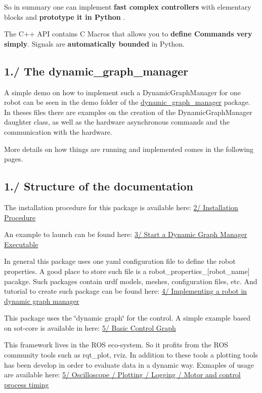 So in summary one can implement {\bfseries  fast complex controllers } with elementary blocks and {\bfseries  prototype it in Python }.

The C++ A\+PI contains C Macros that allows you to {\bfseries define Commands very simply}. Signals are {\bfseries automatically bounded} in Python.\hypertarget{index_intro_sec_dgm}{}\subsection{1./ The dynamic\+\_\+graph\+\_\+manager}\label{index_intro_sec_dgm}
 A simple demo on how to implement such a Dynamic\+Graph\+Manager for one robot can be seen in the demo folder of the \hyperlink{namespacedynamic__graph__manager}{dynamic\+\_\+graph\+\_\+manager} package. In theses files there are examples on the creation of the Dynamic\+Graph\+Manager daughter class, as well as the hardware asynchronous commands and the communication with the hardware.

More details on how things are running and implemented comes in the following pages.\hypertarget{index_intro_sec_structure}{}\subsection{1./ Structure of the documentation}\label{index_intro_sec_structure}
The installation procedure for this package is available here\+: \hyperlink{subpage_installation}{2/ Installation Procedure}

An example to launch can be found here\+: \hyperlink{subpage_launch}{3/ Start a Dynamic Graph Manager Executable}

In general this package uses one yaml configuration file to define the robot properties. A good place to store such file is a robot\+\_\+properties\+\_\+\mbox{[}robot\+\_\+name\mbox{]} pacakge. Such packages contain urdf models, meshes, configuration files, etc. And tutorial to create such package can be found here\+: \hyperlink{subpage_robot_properties}{4/ Implementing a robot in dynamic graph manager}

This package uses the \char`\"{}dynamic graph\char`\"{} for the control. A simple example based on sot-\/core is available in here\+: \hyperlink{subpage_basic_control_graph}{5/ Basic Control Graph}

This framework lives in the R\+OS eco-\/system. So it profits from the R\+OS community tools such as rqt\+\_\+plot, rviz. In addition to these tools a plotting tools has been develop in order to evaluate data in a dynamic way. Exmaples of usage are available here\+: \hyperlink{subpage_plot}{5/ Oscilloscope / Plotting / Logging / Motor and control process timing}

